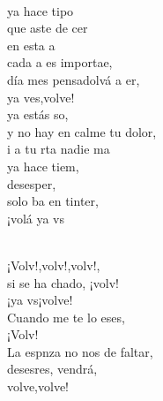 \documentclass[12pt]{article}
\begin{document}
\begin{multicols*}{2}
\begin{cancion}
\begin{chorus}
	\end{chorus}%
	\jump\\
	ya hace tipo\\
	que aste de cer\\
	 en esta a \\
	cada a es importae,\\
	día mes pensadolvá a er,\\
	ya ves,volve!\\
	ya estás so,\\
	y no hay en calme tu dolor,\\
	i a tu rta nadie ma \\
	ya hace tiem,\\
	desesper, \\
	solo ba en tinter,\\
	¡volá ya vs\\\jump\\
	\begin{chorus}%
	¡Volv!,volv!,volv!,     \\
	si se ha chado, ¡volv!\\
	¡ya vs¡volve!\\
	Cuando me te lo eses,\\
	¡Volv!\\
	La espnza no nos  de faltar,\\
	desesres, vendrá,\\
	volve,volve!\\
	\end{chorus}%
	\jump\\
\end{cancion}%


\end{multicols*}
\end{document}
